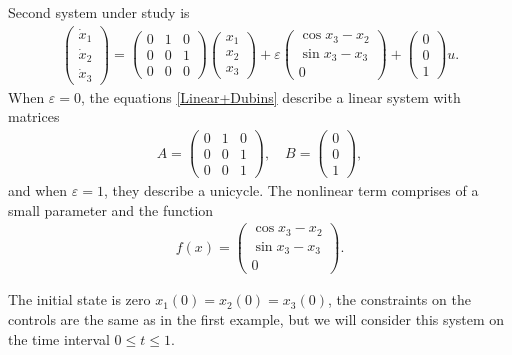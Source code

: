 \documentclass[../main.tex]{subfiles}
\begin{document}
\begin{pr}  
	Second system under study is
	\begin{gather}\label{Linear+Dubins}
		\begin{pmatrix} 
			\dot{x}_1 \\
			\dot{x}_2 \\ 
			\dot{x}_3 \end{pmatrix} = 
		\begin{pmatrix}
			0 & 1 & 0 \\
			0 & 0 & 1 \\
			0 & 0 & 0
		\end{pmatrix}
		\begin{pmatrix} 
			x_1 \\
			x_2 \\ 
			x_3 \end{pmatrix} + 
		\varepsilon
		\begin{pmatrix}
			\cos x_3 - x_2\\
			\sin x_3 - x_3 \\
			0
		\end{pmatrix} + 
		\begin{pmatrix}
			0 \\ 0 \\ 1
		\end{pmatrix} u.
	\end{gather}
	When $\varepsilon = 0$, the equations \eqref{Linear+Dubins} describe a linear system with matrices 
	\begin{gather*}
		A = \begin{pmatrix} 0 & 1 & 0\\
			0 & 0 & 1\\ 
			0 & 0 & 1 
		\end{pmatrix}, \quad B = \begin{pmatrix}
			0\\
			0\\
			1
		\end{pmatrix},
	\end{gather*}
	and when $\varepsilon = 1$, they describe a unicycle. The nonlinear term comprises of a small parameter and the function
	\begin{gather*}
		f(x) = \begin{pmatrix}
			\cos x_3 - x_2\\
			\sin x_3 - x_3 \\
			0
		\end{pmatrix}.
	\end{gather*}
	
	The initial state is zero $x_1(0) = x_2(0) = x_3(0) $, the constraints on the controls are the same as in the first example, but we will consider this system on the time interval $0 \leqslant t \leqslant 1$.
	

\end{pr}
\end{document}
